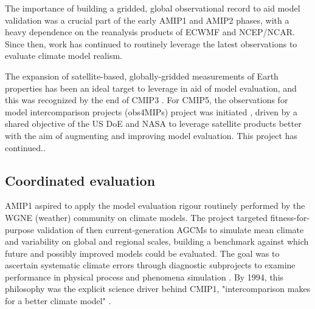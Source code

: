 \documentclass[gmd, preprint]{copernicus}
\def\cred#1{{\color{red}#1}}
\begin{document}
The importance of building a gridded, global observational record to aid model validation was a crucial part of the early AMIP1 \citep{gates_amip_1992} and AMIP2 \citep{gleckler_amip_1996-1} phases, with a heavy dependence on the reanalysis products of ECWMF and NCEP/NCAR. Since then, work has continued to routinely leverage the latest observations to evaluate climate model realism.

The expansion of satellite-based, globally-gridded measurements of Earth properties has been an ideal target to leverage in aid of model evaluation, and this was recognized by the end of CMIP3 . For CMIP5, the observations for model intercomparison projects (obs4MIPs) project was initiated \citep{teixeira_satellite_2014}, driven by a shared objective of the US DoE and NASA to leverage satellite products better with the aim of augmenting and improving model evaluation. \cred{This project has continued.. }


\subsection{Coordinated evaluation}
\label{sec:CMIP6SupportingProjects-CoordEval}

AMIP1 aspired to apply the model evaluation rigour routinely performed by the WGNE (weather) community on climate models. The project targeted fitness-for-purpose validation of then current-generation AGCMs to simulate mean climate and variability on global and regional scales, building a benchmark against which future and possibly improved models could be evaluated. The goal was to ascertain systematic climate errors through diagnostic subprojects to examine performance in physical process and phenomena simulation \citep{gates_ams_1992}. By 1994, this philosophy was the explicit science driver behind CMIP1, "intercomparison makes for a better climate model" \citep{meehl_intercomparison_1997}.
\end{document}
